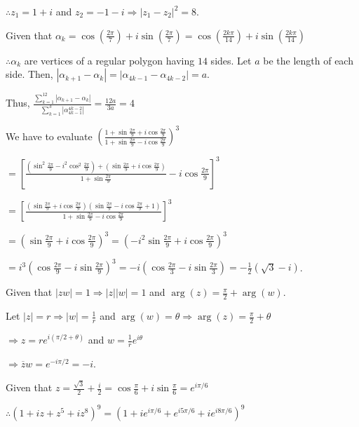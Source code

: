   $\therefore z_1 = 1 + i$ and $z_2 = -1 - i\Rightarrow |z_1 - z_2|^2 = 8$.
\item Given that $\alpha_k = \cos\left(\frac{2\pi}{7}\right) + i\sin\left(\frac{2\pi}{7}\right)
  = \cos\left(\frac{2k\pi}{14}\right) + i\sin\left(\frac{2k\pi}{14}\right)$

  $\therefore \alpha_k$ are vertices of a regular polygon having $14$ sides. Let $a$ be the length of each
  side. Then, $|\alpha_{k + 1} - \alpha_k| = |\alpha_{4k - 1} - \alpha_{4k - 2}| = a$.

  Thus, $\displaystyle\frac{\sum_{k = 1}^{12}|\alpha_{k + 1} - \alpha_k|}{\sum_{k = 1}^3|\alpha_{4k - 1}^{4k
      - 2}|} = \frac{12a}{3a} = 4$
\item We have to evaluate $\displaystyle\left(\frac{1 + \sin\frac{2\pi}{9} + i\cos\frac{2\pi}{9}}{1
  + \sin\frac{2\pi}{9} - i\cos\frac{2\pi}{9}}\right)^3$

  $= \displaystyle\left[\frac{\left(\sin^2\frac{2\pi}{9} - i^2\cos^2\frac{2\pi}{9}\right)
    + \left(\sin\frac{2\pi}{9} + i\cos\frac{2\pi}{9}\right)}{1 + \sin\frac{2\pi}{9}} -
  i\cos\frac{2\pi}{9}\right]^3$

  $= \displaystyle\left[\frac{\left(\sin\frac{2\pi}{9} + i\cos\frac{2\pi}{9}\right)\left(\sin\frac{2\pi}{9}
    - i\cos\frac{2\pi}{9} + 1\right)}{1 + \sin\frac{2\pi}{9} - i\cos\frac{2\pi}{9}}\right]^3$

  $= \displaystyle\left(\sin\frac{2\pi}{9} + i\cos\frac{2\pi}{9}\right)^3 = \left(-i^2\sin\frac{2\pi}{9} +
  i\cos\frac{2\pi}{9}\right)^3$

  $= i^3\left(\cos\frac{2\pi}{9} - i\sin\frac{2\pi}{9}\right)^3 = -i \left(\cos\frac{2\pi}{3} -
  i\sin\frac{2\pi}{3}\right) = -\frac{1}{2}(\sqrt{3} - i)$.
\item Given that $|zw| = 1\Rightarrow |z||w| = 1$ and $\arg(z) = \frac{\pi}{2} + \arg(w)$.

  Let $|z| = r\Rightarrow |w| = \frac{1}{r}$ and $\arg(w) = \theta \Rightarrow \arg(z) = \frac{\pi}{2}
  + \theta$

  $\Rightarrow z = re^{i(\pi/2 + \theta)}$ and $w = \frac{1}{r}e^{i\theta}$

  $\Rightarrow \overline{z}w = e^{-i\pi/2} = -i$.
\item Given that $z = \frac{\sqrt{3}}{2} + \frac{i}{2} = \cos\frac{\pi}{6} + i\sin\frac{\pi}{6} =
  e^{i\pi/6}$

  $\therefore \left(1 + iz + z^5 + iz^8\right)^9 = \left(1 + ie^{i\pi/6} + e^{i5\pi/6} +
  ie^{i8\pi/6}\right)^9$

